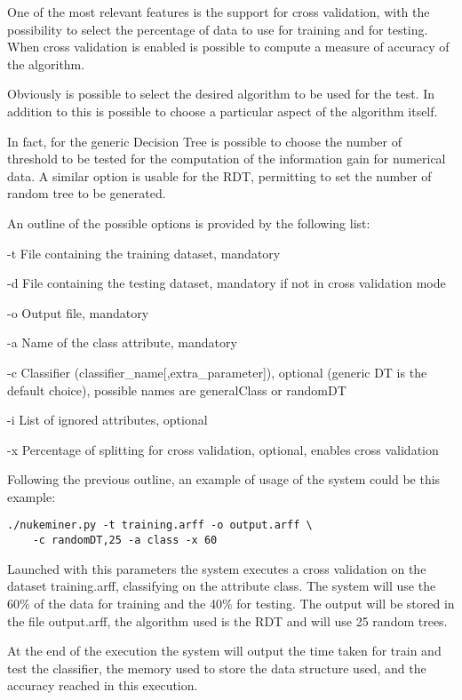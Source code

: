\documentclass{acm_proc_article-sp-sigmod07}
\begin{document}
One of the most relevant features is the support for cross validation,
with the possibility to select the percentage of data to use for training
and for testing.
When cross validation is enabled is possible to compute a measure of
accuracy of the algorithm. 

Obviously is possible to select the desired algorithm to be used for the
test. In addition to this is possible to choose a particular aspect of the
algorithm itself.

In fact, for the generic Decision Tree is possible to choose the number of
threshold to be tested for the computation of the information gain for
numerical data.
A similar option is usable for the RDT, permitting to set the number of
random tree to be generated.

An outline of the possible options is provided by the following list:
\begin{description}
\item{-t} File containing the training dataset, mandatory
\item{-d} File containing the testing dataset, mandatory if not in cross
validation mode
\item{-o} Output file, mandatory
\item{-a} Name of the class attribute, mandatory
\item{-c} Classifier (classifier\_name[,extra\_parameter]), optional
(generic DT is the default choice), possible names are generalClass or
randomDT
\item{-i} List of ignored attributes, optional
\item{-x} Percentage of splitting for cross validation, optional, enables
cross validation
\end{description}
	
Following the previous outline, an example of usage of the system could be
this example:
\begin{verbatim}
./nukeminer.py -t training.arff -o output.arff \
    -c randomDT,25 -a class -x 60
\end{verbatim}

Launched with this parameters the system executes a cross validation on
the dataset training.arff, classifying on the attribute class. The system
will use the 60\% of the data for training and the 40\% for testing. The
output will be stored in the file output.arff, the algorithm used is the
RDT and will use 25 random trees.

At the end of the execution the system will output the time taken for
train and test the classifier, the memory used to store the data structure
used, and the accuracy reached in this execution.
\end{document}
